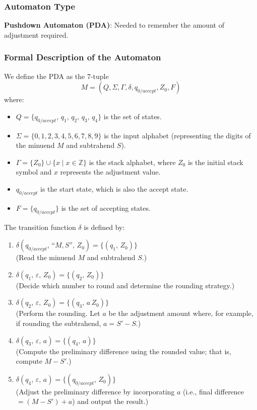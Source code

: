 \documentclass[11pt]{article}
\begin{document}
 







\subsubsection*{Automaton Type}
\textbf{Pushdown Automaton (PDA)}: Needed to remember the amount of adjustment required.

\subsubsection*{Formal Description of the Automaton}

We define the PDA as the 7-tuple
\[
M = (Q,\Sigma,\Gamma,\delta,q_{0/accept},Z_0,F)
\]
where:
\begin{itemize}
    \item \(Q = \{q_{0/accept},\, q_1,\, q_2,\, q_3,\, q_4\}\) is the set of states.
    \item \(\Sigma = \{0,1,2,3,4,5,6,7,8,9\}\) is the input alphabet (representing the digits of the minuend \(M\) and subtrahend \(S\)).
    \item \(\Gamma = \{Z_0\} \cup \{x \mid x \in \mathbb{Z}\}\) is the stack alphabet, where \(Z_0\) is the initial stack symbol and \(x\) represents the adjustment value.
    \item \(q_{0/accept}\) is the start state, which is also the accept state.
    \item \(F = \{q_{0/accept}\}\) is the set of accepting states.
\end{itemize}

The transition function \(\delta\) is defined by:
\begin{enumerate}
    \item \(\delta(q_{0/accept},\, \text{``}M,S\text{''},\, Z_0) = \{(q_1,\, Z_0)\}\) \\
          (Read the minuend \(M\) and subtrahend \(S\).)
    \item \(\delta(q_1,\, \varepsilon,\, Z_0) = \{(q_2,\, Z_0)\}\) \\
          (Decide which number to round and determine the rounding strategy.)
    \item \(\delta(q_2,\, \varepsilon,\, Z_0) = \{(q_3,\, a\,Z_0)\}\) \\
          (Perform the rounding. Let \(a\) be the adjustment amount where, for example, if rounding the subtrahend, \(a = S' - S\).)
    \item \(\delta(q_3,\, \varepsilon,\, a) = \{(q_4,\, a)\}\) \\
          (Compute the preliminary difference using the rounded value; that is, compute \(M - S'\).)
    \item \(\delta(q_4,\, \varepsilon,\, a) = \{(q_{0/accept},\, Z_0)\}\) \\
          (Adjust the preliminary difference by incorporating \(a\) (i.e., final difference \(= (M - S') + a\)) and output the result.)
\end{enumerate}
\end{document}
